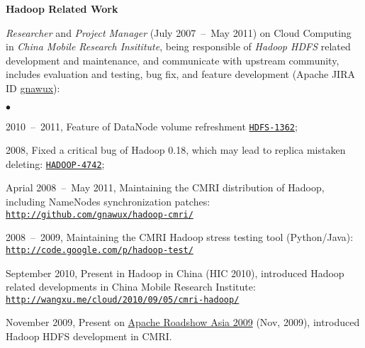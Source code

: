 \documentclass[a4paper,margin,line]{res}
\newenvironment{list1}{
  \begin{list}{\ding{113}}{%
      \setlength{\itemsep}{0in}
      \setlength{\parsep}{0in} \setlength{\parskip}{0in}
      \setlength{\topsep}{0in} \setlength{\partopsep}{0in} 
      \setlength{\leftmargin}{0.17in}}}{\end{list}}
\newenvironment{list2}{
  \begin{list}{$\bullet$}{%
      \setlength{\itemsep}{0in}
      \setlength{\parsep}{0in} \setlength{\parskip}{0in}
      \setlength{\topsep}{0in} \setlength{\partopsep}{0in} 
      \setlength{\leftmargin}{0.2in}}}{\end{list}}
\newcommand{\http}{http:/\hspace{-0.3ex}/}
\newcommand{\hindent}{\mbox{\hspace{8ex}}}
\begin{document}
\begin{resume}
\textbf{Hadoop Related Work}\\
\vspace*{-.1in}
\begin{list1}
\item[] \emph{Researcher}\/ and \emph{Project Manager}\/ (July 2007~--~May 2011) on Cloud Computing in \textit{China Mobile Research Insititute}, being responsible of \textit{Hadoop HDFS} related development and maintenance, and communicate with upstream community, includes evaluation and testing, bug fix, and feature development (Apache JIRA ID \href{https://issues.apache.org/jira/secure/ViewProfile.jspa?name=gnawux}{gnawux}):
\begin{list2}
\vspace*{.05in}
\item 2010~--~2011, Feature of DataNode volume refreshment \href{https://issues.apache.org/jira/browse/HDFS-1362}{\tt HDFS-1362};
\item 2008, Fixed a critical bug of Hadoop 0.18, which may lead to replica mistaken deleting: \href{https://issues.apache.org/jira/browse/HADOOP-4742}{\tt HADOOP-4742};
\item Aprial 2008~--~May 2011, Maintaining the CMRI distribution of Hadoop, including NameNodes synchronization patches:\\
          \hindent\href{http://github.com/gnawux/hadoop-cmri/}{\tt\http{}github.com/gnawux/hadoop-cmri/}
\item 2008~--~2009, Maintaining the CMRI Hadoop stress testing tool (Python/Java):\\
          \hindent\href{http://code.google.com/p/hadoop-test/}{\tt\http{}code.google.com/p/hadoop-test/} 
\item September 2010, Present in Hadoop in China (HIC 2010), introduced Hadoop related developments in China Mobile Research Institute:\\
          \hindent\href{http://wangxu.me/cloud/2010/09/05/cmri-hadoop/}{\tt \http{}wangxu.me/cloud/2010/09/05/cmri-hadoop/}
\item November 2009, Present on \href{http://wiki.apache.org/apachecon/ApacheRoadshowAsia09Beijing}{Apache Roadshow Asia 2009} (Nov, 2009), introduced Hadoop HDFS development in CMRI.
\end{list2}
\end{list1}


\end{resume}
\end{document}
